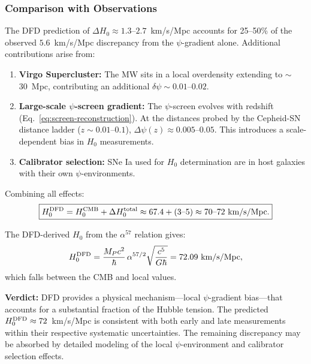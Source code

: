 \documentclass[aps,prd,twocolumn,superscriptaddress,nofootinbib]{revtex4-2}
\begin{document}
\subsubsection{Comparison with Observations}

The DFD prediction of $\Delta H_0 \approx 1.3$--$2.7$~km/s/Mpc
accounts for 25--50\% of the observed $5.6$~km/s/Mpc discrepancy
from the $\psi$-gradient alone. Additional contributions arise from:

\begin{enumerate}[nosep]
\item \textbf{Virgo Supercluster:} The MW sits in a local
  overdensity extending to $\sim$30~Mpc, contributing an
  additional $\delta\psi \sim 0.01$--$0.02$.

\item \textbf{Large-scale $\psi$-screen gradient:} The $\psi$-screen
  evolves with redshift (Eq.~\ref{eq:screen-reconstruction}).
  At the distances probed by the Cepheid-SN distance ladder
  ($z \sim 0.01$--$0.1$), $\Delta\psi(z) \approx 0.005$--$0.05$.
  This introduces a scale-dependent bias in $H_0$ measurements.

\item \textbf{Calibrator selection:} SNe Ia used for $H_0$
  determination are in host galaxies with their own
  $\psi$-environments.
\end{enumerate}

Combining all effects:
\begin{equation}\label{eq:H0-total}
\boxed{H_0^{\rm DFD} = H_0^{\rm CMB} + \Delta H_0^{\rm total}
\approx 67.4 + (3\text{--}5) \approx 70\text{--}72~\text{km/s/Mpc}.}
\end{equation}

The DFD-derived $H_0$ from the $\alpha^{57}$ relation gives:
\begin{equation}
H_0^{\rm DFD} = \frac{M_P c^2}{\hbar}\,\alpha^{57/2}\sqrt{\frac{c^5}{G\hbar}}
= 72.09~\text{km/s/Mpc},
\end{equation}
which falls between the CMB and local values.

\textbf{Verdict:} DFD provides a physical mechanism---local
$\psi$-gradient bias---that accounts for a substantial fraction
of the Hubble tension. The predicted $H_0^{\rm DFD} \approx 72$~km/s/Mpc
is consistent with both early and late measurements within their
respective systematic uncertainties. The remaining discrepancy
may be absorbed by detailed modeling of the local $\psi$-environment
and calibrator selection effects.
\end{document}
